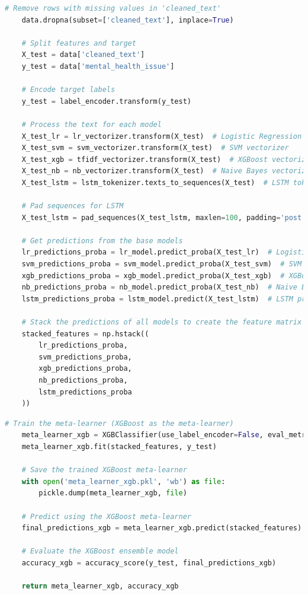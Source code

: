\begin{tcolorbox}[colback=gray!5!white, colframe=gray!80!black, boxrule=0.5pt, title=Retraining the Ensemble Model]
    \begin{lstlisting}[language=Python]
    # Remove rows with missing values in 'cleaned_text'
    data.dropna(subset=['cleaned_text'], inplace=True)

    # Split features and target
    X_test = data['cleaned_text']
    y_test = data['mental_health_issue']

    # Encode target labels
    y_test = label_encoder.transform(y_test)

    # Process the text for each model
    X_test_lr = lr_vectorizer.transform(X_test)  # Logistic Regression vectorizer
    X_test_svm = svm_vectorizer.transform(X_test)  # SVM vectorizer
    X_test_xgb = tfidf_vectorizer.transform(X_test)  # XGBoost vectorizer
    X_test_nb = nb_vectorizer.transform(X_test)  # Naive Bayes vectorizer
    X_test_lstm = lstm_tokenizer.texts_to_sequences(X_test)  # LSTM tokenizer

    # Pad sequences for LSTM
    X_test_lstm = pad_sequences(X_test_lstm, maxlen=100, padding='post', truncating='post')

    # Get predictions from the base models
    lr_predictions_proba = lr_model.predict_proba(X_test_lr)  # Logistic Regression probabilities
    svm_predictions_proba = svm_model.predict_proba(X_test_svm)  # SVM probabilities
    xgb_predictions_proba = xgb_model.predict_proba(X_test_xgb)  # XGBoost probabilities
    nb_predictions_proba = nb_model.predict_proba(X_test_nb)  # Naive Bayes probabilities
    lstm_predictions_proba = lstm_model.predict(X_test_lstm)  # LSTM probabilities

    # Stack the predictions of all models to create the feature matrix for the meta-learner
    stacked_features = np.hstack((
        lr_predictions_proba,
        svm_predictions_proba,
        xgb_predictions_proba,
        nb_predictions_proba,
        lstm_predictions_proba
    ))
\end{lstlisting}
\end{tcolorbox}
\begin{tcolorbox}[colback=gray!5!white, colframe=gray!80!black, boxrule=0.5pt, title=Retraining the Ensemble Model]
    \begin{lstlisting}[language=Python]
    # Train the meta-learner (XGBoost as the meta-learner)
    meta_learner_xgb = XGBClassifier(use_label_encoder=False, eval_metric='mlogloss')
    meta_learner_xgb.fit(stacked_features, y_test)

    # Save the trained XGBoost meta-learner
    with open('meta_learner_xgb.pkl', 'wb') as file:
        pickle.dump(meta_learner_xgb, file)

    # Predict using the XGBoost meta-learner
    final_predictions_xgb = meta_learner_xgb.predict(stacked_features)

    # Evaluate the XGBoost ensemble model
    accuracy_xgb = accuracy_score(y_test, final_predictions_xgb)

    return meta_learner_xgb, accuracy_xgb
    \end{lstlisting}
\end{tcolorbox}

